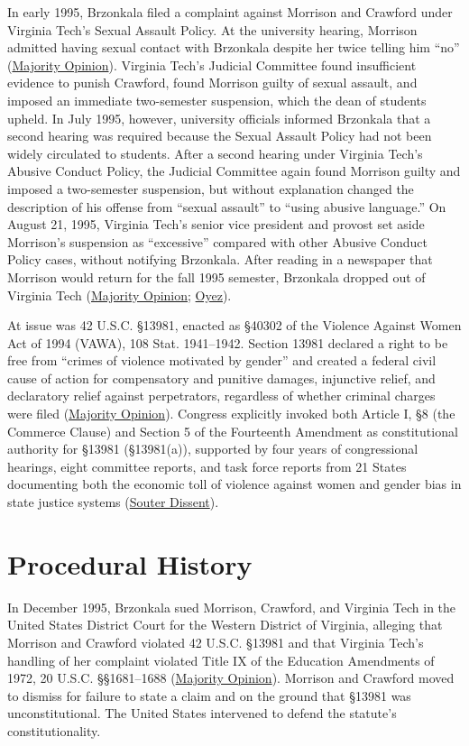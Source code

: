 \documentclass[12pt]{article}
\begin{document}
In early 1995, Brzonkala filed a complaint against Morrison and Crawford under Virginia Tech's Sexual Assault Policy. At the university hearing, Morrison admitted having sexual contact with Brzonkala despite her twice telling him ``no'' (\href{https://www.law.cornell.edu/supct/html/99-5.ZO.html}{Majority Opinion}). Virginia Tech's Judicial Committee found insufficient evidence to punish Crawford, found Morrison guilty of sexual assault, and imposed an immediate two-semester suspension, which the dean of students upheld. In July 1995, however, university officials informed Brzonkala that a second hearing was required because the Sexual Assault Policy had not been widely circulated to students. After a second hearing under Virginia Tech's Abusive Conduct Policy, the Judicial Committee again found Morrison guilty and imposed a two-semester suspension, but without explanation changed the description of his offense from ``sexual assault'' to ``using abusive language.'' On August 21, 1995, Virginia Tech's senior vice president and provost set aside Morrison's suspension as ``excessive'' compared with other Abusive Conduct Policy cases, without notifying Brzonkala. After reading in a newspaper that Morrison would return for the fall 1995 semester, Brzonkala dropped out of Virginia Tech (\href{https://www.law.cornell.edu/supct/html/99-5.ZO.html}{Majority Opinion}; \href{https://www.oyez.org/cases/1999/99-5}{Oyez}).

At issue was 42 U.S.C. \S 13981, enacted as \S 40302 of the Violence Against Women Act of 1994 (VAWA), 108 Stat. 1941--1942. Section 13981 declared a right to be free from ``crimes of violence motivated by gender'' and created a federal civil cause of action for compensatory and punitive damages, injunctive relief, and declaratory relief against perpetrators, regardless of whether criminal charges were filed (\href{https://www.law.cornell.edu/supct/html/99-5.ZO.html}{Majority Opinion}). Congress explicitly invoked both Article I, \S 8 (the Commerce Clause) and Section 5 of the Fourteenth Amendment as constitutional authority for \S 13981 (\S 13981(a)), supported by four years of congressional hearings, eight committee reports, and task force reports from 21 States documenting both the economic toll of violence against women and gender bias in state justice systems (\href{https://www.law.cornell.edu/supct/html/99-5.ZD.html}{Souter Dissent}).

\section{Procedural History}
In December 1995, Brzonkala sued Morrison, Crawford, and Virginia Tech in the United States District Court for the Western District of Virginia, alleging that Morrison and Crawford violated 42 U.S.C. \S 13981 and that Virginia Tech's handling of her complaint violated Title IX of the Education Amendments of 1972, 20 U.S.C. \S\S 1681--1688 (\href{https://www.law.cornell.edu/supct/html/99-5.ZO.html}{Majority Opinion}). Morrison and Crawford moved to dismiss for failure to state a claim and on the ground that \S 13981 was unconstitutional. The United States intervened to defend the statute's constitutionality.
\end{document}
